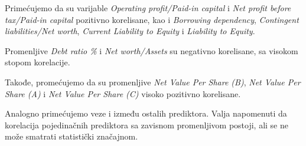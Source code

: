\documentclass[12pt]{article}
\theoremstyle{definition}
\theoremstyle{remark}
\begin{document}
Primećujemo da su varijable \emph{Operating profit/Paid-in capital} i \emph{ Net profit before tax/Paid-in capital} pozitivno korelisane, kao i  \emph{Borrowing dependency}, \emph{Contingent liabilities/Net worth}, \emph{Current Liability to Equity} i \emph{Liability to Equity}.

Promenljive \emph{Debt ratio \%} i \emph{Net worth/Assets} su negativno korelisane, sa visokom stopom korelacije.

Takođe, promećujemo da su promenljive  \emph{ Net Value Per Share (B)},  \emph{Net Value Per Share (A)} i  \emph{ Net Value Per Share (C)} visoko pozitivno korelisane. 

Analogno primećujemo veze i između ostalih prediktora. Valja napomenuti da korelacija pojedinačnih prediktora sa zavisnom promenljivom postoji, ali se ne može smatrati  statistički značajnom. 
\vspace{0.4cm}
\end{document}

